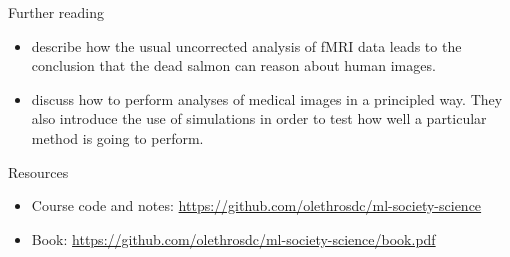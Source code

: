 \begin{frame}
  \begin{block}{Further reading}
    \begin{itemize}
    \item \citet{bennett2012journal} describe how the usual
      uncorrected analysis of fMRI data leads to the conclusion that
      the dead salmon can reason about human images.
    \item \citet{Bennett2009ThePC} discuss how to perform analyses of medical images in a principled way. They also introduce the use of simulations in order to test how well a particular method is going to perform.
    \end{itemize}
  \end{block}

  \begin{block}{Resources}
    \begin{itemize}
    \item Course code and notes:  \url{https://github.com/olethrosdc/ml-society-science}
    \item Book: \url{https://github.com/olethrosdc/ml-society-science/book.pdf}
    \end{itemize}
  \end{block}
\end{frame}






